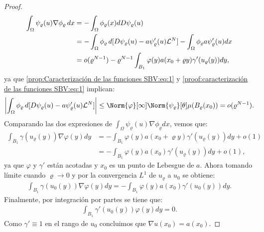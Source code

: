 \documentclass[a4paper,11pt,spanish, twoside, leqno]{tfm-uam}
\begin{document}
\begin{proof}
\begin{align*}
\int_{\Omega}\psi_{\varrho}(u)\nabla{\phi_{\varrho}}\,dx&=-\int_{\Omega}\phi_{\varrho}(x)dD\psi_{\varrho}(u)\\
&=-\int_{\Omega}\phi_{\varrho}\, d[D\psi_{\varrho}(u)-a\psi_{\varrho}'(u)\mathcal{L}^{N}]-\int_{\Omega}\phi_{\varrho}a\psi_{\varrho}'(u)dx\\
&=o(\varrho^{N-1})-\varrho^{N-1}\int_{B_1}\varphi(y)a(x_{0}+\varrho y)\gamma'(u_{\varrho}(y))dy,
\end{align*}
ya que \ref{prop:Caracterización de las funciones SBV:eq:1} y \ref{proof:caracterización de las funciones SBV:eq:1} implican:
\begin{align*}
\abs*{\int_{\Omega}\phi_{\varrho}\, d[D\psi_{\varrho}(u)-a\psi_{\varrho}'(u)\Lm{N}]}\leq \Norm{\varphi}[\infty]\Norm{\psi_{\varrho}}[\theta]\mu(B_{\varrho}(x_{0}))=o(\varrho^{N-1}).
\end{align*}
Comparando las dos expresiones de $\int_{\Omega}\psi_{\varrho}(u)\nabla\phi_{\varrho}dx$, vemos que:
\begin{align*}
\int_{B_1}\gamma(u_{\varrho}(y))\nabla\varphi(y)dy&=-\int_{B_1}\varphi(y)a(x_{0}+\varrho y)\gamma'(u_{\varrho}(y))dy+o(1)
\\&=-\int_{B_1}\varphi(y)a(x_0)\gamma'(u_{\varrho}(y))dy+o(1),
\end{align*}
ya que $\varphi$ y $\gamma'$ están acotadas y $x_{0}$ es un punto de Lebesgue de $a$. Ahora tomando límite cuando $\varrho\to 0$ y por la convergencia $L^{1}$ de $u_{\varrho}$ a $u_{0}$ se obtiene:
\begin{align*}
\int_{B_1}\gamma(u_{0}(y))\nabla{\varphi}(y)dy=-\int_{B_1}\varphi(y)a(x_{0})\gamma'(u_{0}(y))dy.
\end{align*}
Finalmente, por integración por partes se tiene que:
\begin{align*}
[\nabla{u}(x_0)-a(x_{0})]\int_{B_1}\gamma'(u_{0}(y))\varphi(y)dy=0.
\end{align*}
Como $\gamma'\equiv 1$ en el rango de $u_{0}$ concluimos que $\nabla{u}(x_0)=a(x_{0})$.


\end{proof}
\end{document}
